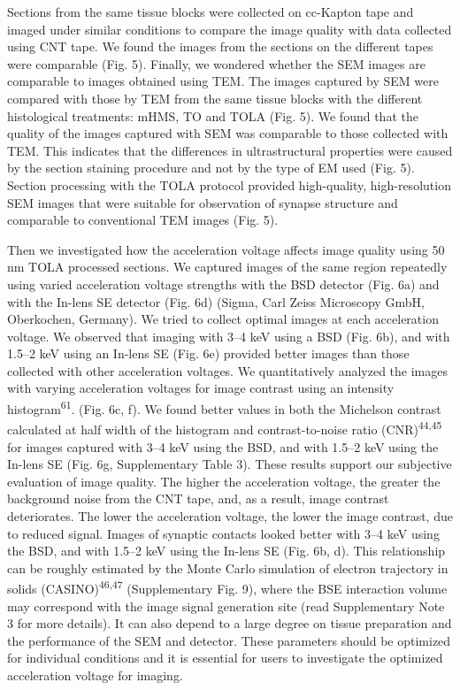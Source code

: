 \documentclass{article}
\begin{document}
Sections from the same tissue blocks were collected on cc-Kapton tape and imaged under similar conditions to compare the image quality with data collected using CNT tape. We found the images from the sections on the different tapes were comparable (Fig. 5). Finally, we wondered whether the SEM images are comparable to images obtained using TEM. The images captured by SEM were compared with those by TEM from the same tissue blocks with the different histological treatments: mHMS, TO and TOLA (Fig. 5). We found that the quality of the images captured with SEM was comparable to those collected with TEM. This indicates that the differences in ultrastructural properties were caused by the section staining procedure and not by the type of EM used (Fig. 5). Section processing with the TOLA protocol provided high-quality, high-resolution SEM images that were suitable for observation of synapse structure and comparable to conventional TEM images (Fig. 5).

Then we investigated how the acceleration voltage affects image quality using 50 nm TOLA processed sections. We captured images of the same region repeatedly using varied acceleration voltage strengths with the BSD detector (Fig. 6a) and with the In-lens SE detector (Fig. 6d) (Sigma, Carl Zeiss Microscopy GmbH, Oberkochen, Germany). We tried to collect optimal images at each acceleration voltage. We observed that imaging with 3–4 keV using a BSD (Fig. 6b), and with 1.5–2 keV using an In-lens SE (Fig. 6e) provided better images than those collected with other acceleration voltages. We quantitatively analyzed the images with varying acceleration voltages for image contrast using an intensity histogram\textsuperscript{61}. (Fig. 6c, f). We found better values in both the Michelson contrast calculated at half width of the histogram and contrast-to-noise ratio (CNR)\textsuperscript{44,45} for images captured with 3–4 keV using the BSD, and with 1.5–2 keV using the In-lens SE (Fig. 6g, Supplementary Table 3). These results support our subjective evaluation of image quality. The higher the acceleration voltage, the greater the background noise from the CNT tape, and, as a result, image contrast deteriorates. The lower the acceleration voltage, the lower the image contrast, due to reduced signal. Images of synaptic contacts looked better with 3–4 keV using the BSD, and with 1.5–2 keV using the In-lens SE (Fig. 6b, d). This relationship can be roughly estimated by the Monte Carlo simulation of electron trajectory in solids (CASINO)\textsuperscript{46,47} (Supplementary Fig. 9), where the BSE interaction volume may correspond with the image signal generation site (read Supplementary Note 3 for more details). It can also depend to a large degree on tissue preparation and the performance of the SEM and detector. These parameters should be optimized for individual conditions and it is essential for users to investigate the optimized acceleration voltage for imaging.
\end{document}
